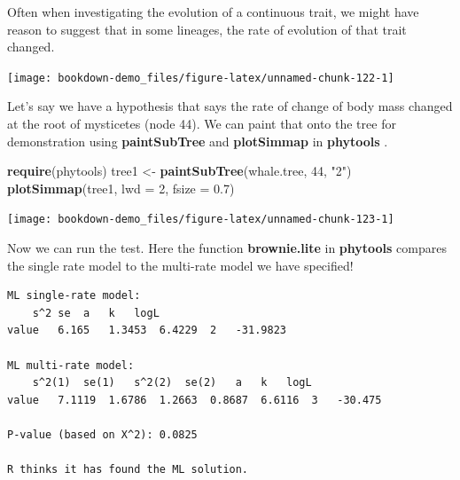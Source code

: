 \documentclass[
]{book}
\newenvironment{Shaded}{\begin{snugshade}}{\end{snugshade}}
\newcommand{\DataTypeTok}[1]{\textcolor[rgb]{0.13,0.29,0.53}{#1}}
\newcommand{\DecValTok}[1]{\textcolor[rgb]{0.00,0.00,0.81}{#1}}
\newcommand{\FloatTok}[1]{\textcolor[rgb]{0.00,0.00,0.81}{#1}}
\newcommand{\KeywordTok}[1]{\textcolor[rgb]{0.13,0.29,0.53}{\textbf{#1}}}
\newcommand{\NormalTok}[1]{#1}
\newcommand{\OperatorTok}[1]{\textcolor[rgb]{0.81,0.36,0.00}{\textbf{#1}}}
\newcommand{\StringTok}[1]{\textcolor[rgb]{0.31,0.60,0.02}{#1}}
\begin{document}
Often when investigating the evolution of a continuous trait, we might have reason to suggest that in some lineages, the rate of evolution of that trait changed.

\begin{center}\texttt{[image: bookdown-demo\_files/figure-latex/unnamed-chunk-122-1]} \end{center}

Let's say we have a hypothesis that says the rate of change of body mass changed at the root of mysticetes (node 44). We can paint that onto the tree for demonstration using \textbf{paintSubTree} and \textbf{plotSimmap} in \textbf{phytools} \citep{phytools}.

\begin{Shaded}
\begin{Highlighting}[]
\KeywordTok{require}\NormalTok{(phytools)}
\NormalTok{tree1 \textless{}{-}}\StringTok{ }\KeywordTok{paintSubTree}\NormalTok{(whale.tree, }\DecValTok{44}\NormalTok{, }\StringTok{"2"}\NormalTok{)}
\KeywordTok{plotSimmap}\NormalTok{(tree1, }\DataTypeTok{lwd =} \DecValTok{2}\NormalTok{, }\DataTypeTok{fsize =} \FloatTok{0.7}\NormalTok{)}
\end{Highlighting}
\end{Shaded}

\begin{center}\texttt{[image: bookdown-demo\_files/figure-latex/unnamed-chunk-123-1]} \end{center}

Now we can run the test. Here the function \textbf{brownie.lite} in \textbf{phytools} compares the single rate model to the multi-rate model we have specified!

\begin{Shaded}
\end{Shaded}

\begin{verbatim}
ML single-rate model:
    s^2 se  a   k   logL
value   6.165   1.3453  6.4229  2   -31.9823    

ML multi-rate model:
    s^2(1)  se(1)   s^2(2)  se(2)   a   k   logL    
value   7.1119  1.6786  1.2663  0.8687  6.6116  3   -30.475

P-value (based on X^2): 0.0825 

R thinks it has found the ML solution.
\end{verbatim}
\end{document}
